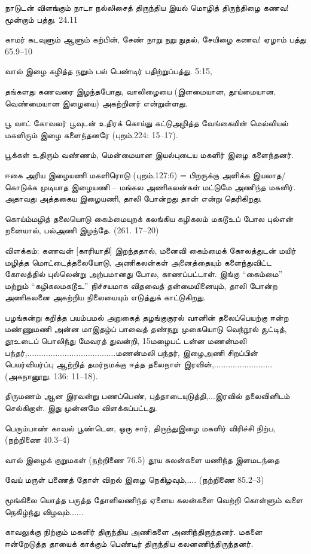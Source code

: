 நாடுடன் விளங்கும் நாடா நல்லிசைத் திருந்திய இயல் மொழித் திருந்திழை கணவ! மூன்றாம் பத்து. 24.11

காமர் கடவுளும் ஆளும் கற்பின், சேண் நாறு நறு நுதல், சேயிழை கணவ! ஏழாம் பத்து 65.9–10

வால் இழை கழித்த நறும் பல் பெண்டிர் பதிற்றுப்பத்து. 5:15,

தங்களது கணவரை இழந்தபோது, வாலிழையை (இளமையான, தூய்மையான, வெண்மையான இழையை) அகற்றினர் என்றுள்ளது.

பூ வாட் கோவலர் பூவுடன் உதிரக் கொய்து கட்டுஅழித்த வேங்கையின் மெல்லியல் மகளிரும் இழை களைந்தனரே (புறம்.224: 15–17). 

பூக்கள் உதிரும் வண்ணம், மென்மையான இயல்புடைய மகளிர் இழை களைந்தனர்.

ஈகை அரிய இழையணி மகளிரொடு (புறம்.127:6) = பிறருக்கு அளிக்க இயலாத/ கொடுக்க முடியாத இழையணி – மங்கல அணிகலன்கள் மட்டுமே அணிந்த மகளிர். அதாவது அத்தகைய இழையணி, தாலி போன்றது தான் என்று தெரிகிறது.

கொய்ம்மழித் தலையொடு கைம்மையுறக் கலங்கிய கழிகலம் மகடூஉப் போல புல்என் றனையால், பல்அணி இழந்தே. (261. 17–20)

விளக்கம்: கணவன் [காரியாதி] இறந்ததால், மனைவி கைம்மைக் கோலத்துடன் மயிர் மழித்த மொட்டைத்தலையோடு, அணிகலன்கள் அனைத்தையும் களைந்துவிட்ட கோலத்தில் புல்லென்று அற்பமானது போல, காணப்பட்டாள். இங்கு “கைம்மை” மற்றும் “கழிகலமகடூஉ” நிச்சயமாக விதவைத் தன்மையினையும், தாலி போன்ற அணிகலனை அகற்றிய நிலையையும் எடுத்துக் காட்டுகிறது.

பழங்கன்று கறித்த பயம்பமல் அறுகைத் தழங்குகுரல் வானின் தலைப்பெயற்கு ஈன்ற மண்ணுமணி அன்ன மாஇதழ்ப் பாவைத் தண்நறு முகையொடு வெந்நூல் சூட்டித், தூஉடைப் பொலிந்து மேவரத் துவன்றி, 15மழைபட் டன்ன மணன்மலி பந்தர்,......................................மணன்மலி பந்தர், இழைஅணி சிறப்பின் பெயர்வியர்ப்பு ஆற்றித் தமர்நமக்கு ஈத்த தலைநாள் இரவின்,......................... (அகநானூறு. 136: 11–18).

திருமணம் ஆன இரவன்று பணப்பெண், புத்தாடையுடுத்தி,...இரவில் தலைவினிடம் செல்கிறாள். இது முன்னமே விளக்கப்பட்டது.

 பெரும்பாண் காவல் பூண்டென, ஒரு சார், திருந்துஇழை மகளிர் விரிச்சி நிற்ப, (நற்றிணை 40.3–4)

வால் இழைக் குறுமகள் (நற்றிணை 76.5) தூய கலன்களை யணிந்த இளமடந்தை

வேய் மருள் பணைத் தோள் விறல் இழை நெகிழவும்,.... (நற்றிணை 85.2–3)

மூங்கிலை யொத்த பருத்த தோளிலணிந்த ஏனைய கலன்களை வெற்றி கொள்ளும் வளை நெகிழ்ந்து விழவும்......

காவலுக்கு நிற்கும் மகளிர் திருந்திய அணிகளை அணிந்திருந்தனர். மகனை ஈன்றேடுத்த தாயைக் காக்கும் பெண்டிர் திருந்திய கலனணிந்திருந்தனர்.

